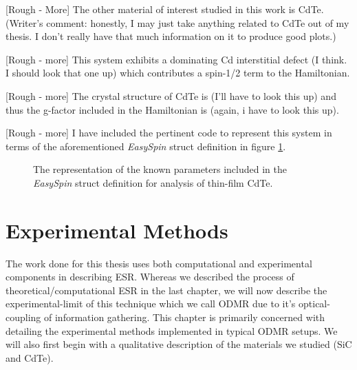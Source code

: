 \documentclass[oneside, astronomy, noacknowlegments]{BYUPhys}
\begin{document}
[Rough - More] The other material of interest studied in this work is CdTe. (Writer's comment: honestly, I may just take anything related to CdTe out of my thesis. I don't really have that much information on it to produce good plots.)

[Rough - more] This system exhibits a dominating Cd interstitial defect (I think. I should look that one up) which contributes a spin-1/2 term to the Hamiltonian.

[Rough - more] The crystal structure of CdTe is (I'll have to look this up) and thus the g-factor included in the Hamiltonian is (again, i have to look this up).

[Rough - more] I have included the pertinent code to represent this system in terms of the aforementioned \textit{EasySpin} struct definition in figure \ref{fig:CdTeParams}.

\begin{figure}
    \caption[The \textit{EasySpin} representation of CdTe]{\label{fig:CdTeParams}
     The representation of the known parameters included in the \textit{EasySpin} struct definition for analysis of thin-film CdTe.}
 \end{figure}
 










\chapter{Experimental Methods}

The work done for this thesis uses both computational and experimental components in describing ESR. Whereas we described the process of theoretical/computational ESR in the last chapter, we will now describe the experimental-limit of this technique which we call ODMR due to it's optical-coupling of information gathering. This chapter is primarily concerned with detailing the experimental methods implemented in typical ODMR setups. We will also first begin with a qualitative description of the materials we studied (SiC and CdTe).
\end{document}
